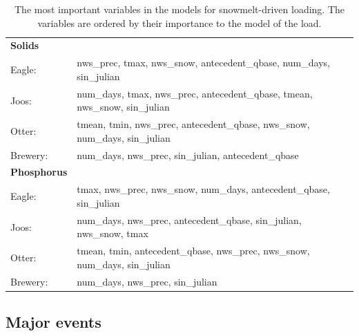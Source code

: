 \documentclass[12pt]{article}
\begin{document}
\begin{table}[h!]\small
    \begin{center}
    \begin{tabular}{ll}
        \textbf{Solids} & \\
        \hspace{5mm} Eagle: & nws\_prec, tmax, nws\_snow, antecedent\_qbase, num\_days, sin\_julian\\
        \hspace{5mm} Joos: & num\_days, tmax, nws\_prec, antecedent\_qbase, tmean, nws\_snow, sin\_julian\\
        \hspace{5mm} Otter: & tmean, tmin, nws\_prec, antecedent\_qbase, nws\_snow, num\_days, sin\_julian\\
        \hspace{5mm} Brewery: & num\_days, nws\_prec, sin\_julian, antecedent\_qbase
    \vspace{2mm}\\
        \textbf{Phosphorus} & \\
        \hspace{5mm} Eagle: & tmax, nws\_prec, nws\_snow, num\_days, antecedent\_qbase, sin\_julian\\
        \hspace{5mm} Joos: & num\_days, nws\_prec, antecedent\_qbase, sin\_julian, nws\_snow, tmax\\
        \hspace{5mm} Otter: & tmean, tmin, antecedent\_qbase, nws\_prec, nws\_snow, num\_days, sin\_julian\\
        \hspace{5mm} Brewery: & num\_days, nws\_prec, sin\_julian\\
    \end{tabular}
    \caption{The most important variables in the models for snowmelt-driven loading. The variables are ordered by their importance to the model of the load. \label{snow_predictor_list}}
    \end{center}
\end{table}

\subsection{Major events}
\end{document}

